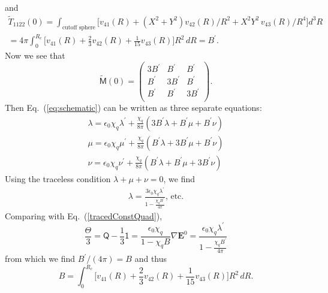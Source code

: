and 
\begin{gather*}
\tilde{T}_{1122}(0)=
\int_{\textrm{cutoff sphere}} 
\big [ v_{41}(R)+(X^2+Y^2) v_{42}(R)/R^2 + X^2 Y^2\,v_{43}(R)/R^4 \big] d^3R \\
=4\pi \int_0^{R_c}
\big [ v_{41}(R)+\frac{2}{3} v_{42}(R) + \frac{1}{15}v_{43}(R) \big] R^2\,dR =
B^\prime .
\end{gather*}
Now we see that
\begin{equation*}
\mathsf{\tilde{M}}(0)=
\begin{pmatrix}
3B^\prime & B^\prime & B^\prime\\
B^\prime & 3B^\prime & B^\prime\\
B^\prime & B^\prime & 3B^\prime\\
\end{pmatrix} .
\end{equation*}
Then Eq.~(\ref{eq:schematic}) can be written as three separate equations:
\begin{gather*}
\lambda=\epsilon_0 \chi_q \lambda^\prime+\frac{\chi_q}{8\pi}(3B^\prime \lambda+B^\prime \mu +B^\prime \nu)\\
\mu=\epsilon_0 \chi_q \mu^\prime+\frac{\chi_q}{8\pi}(B^\prime \lambda+3B^\prime \mu +B^\prime \nu)\\
\nu=\epsilon_0 \chi_q \nu^\prime+\frac{\chi_q}{8\pi}(B^\prime \lambda+B^\prime \mu +3B^\prime \nu)
\end{gather*}
Using the traceless condition $\lambda+\mu+\nu=0$,
we find
\begin{gather*}
\lambda=\frac{3 \epsilon_0 \chi_q \lambda^\prime}{1-\frac{\chi_q B^\prime}{4\pi}}  \textrm{, etc.}
\end{gather*}
Comparing with Eq.~(\ref{tracedConstQuad}), 
\begin{equation}
\frac{\Theta}{3}=\mathsf{Q} - \frac{1}{3}\mathsf{1}
=\frac{\epsilon_0 \chi_q}{1-\chi_q B}\nabla \mathbf{E}^0
=\frac{\epsilon_0 \chi_q \lambda^\prime}{1-\frac{\chi_q B^\prime}{4\pi}}
\end{equation}
from which we find $B^\prime/(4\pi)=B$
and thus
\begin{equation} 
B=\int_0^{R_c}
\big [ v_{41}(R)+\frac{2}{3} v_{42}(R) + \frac{1}{15}v_{43}(R) \big] R^2\,dR .
\end{equation}

%
% 
% 